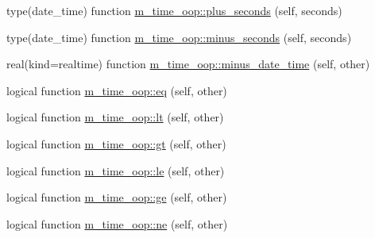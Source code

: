 \begin{DoxyCompactItemize}
\item 
type(date\+\_\+time) function \mbox{\hyperlink{namespacem__time__oop_a6830c1cce303ec401ac8e4333a5a73d4}{m\+\_\+time\+\_\+oop\+::plus\+\_\+seconds}} (self, seconds)
\item 
type(date\+\_\+time) function \mbox{\hyperlink{namespacem__time__oop_a395fbf19c6617641aea39c33fd4b2087}{m\+\_\+time\+\_\+oop\+::minus\+\_\+seconds}} (self, seconds)
\item 
real(kind=realtime) function \mbox{\hyperlink{namespacem__time__oop_a3da83a42a8f957db9bd2f6f0b942ab99}{m\+\_\+time\+\_\+oop\+::minus\+\_\+date\+\_\+time}} (self, other)
\item 
logical function \mbox{\hyperlink{namespacem__time__oop_afcc34853af3eda020eb5ff802e04964d}{m\+\_\+time\+\_\+oop\+::eq}} (self, other)
\item 
logical function \mbox{\hyperlink{namespacem__time__oop_ab0c5ce86d25993804501d59a8106818f}{m\+\_\+time\+\_\+oop\+::lt}} (self, other)
\item 
logical function \mbox{\hyperlink{namespacem__time__oop_a753692f18b6cd100401603d0b88d7c3c}{m\+\_\+time\+\_\+oop\+::gt}} (self, other)
\item 
logical function \mbox{\hyperlink{namespacem__time__oop_a5e04ff772ac6d72f68031ec43c1e6c84}{m\+\_\+time\+\_\+oop\+::le}} (self, other)
\item 
logical function \mbox{\hyperlink{namespacem__time__oop_aeea1131ab511b897168f00a908b75458}{m\+\_\+time\+\_\+oop\+::ge}} (self, other)
\item 
logical function \mbox{\hyperlink{namespacem__time__oop_a7707a7cbd4869301a613ceeb12ed2384}{m\+\_\+time\+\_\+oop\+::ne}} (self, other)
\end{DoxyCompactItemize}
